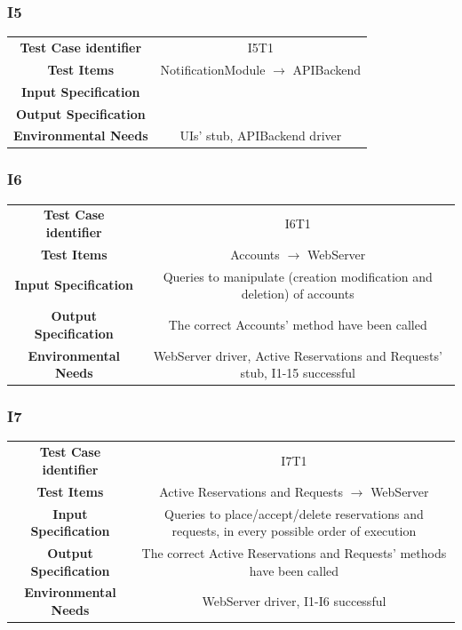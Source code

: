 \documentclass{article}
\begin{document}
\subsubsection{I5}
\begin{adjustbox}{width=1.2\textwidth}	
	\begin{tabular}{*{2}{c}}
		\toprule
		\textbf{Test Case identifier} & I5T1\\
		\textbf{Test Items} & NotificationModule $\rightarrow$ APIBackend\\
		\textbf{Input Specification} & \\ %
		\textbf{Output Specification} & \\%
		\textbf{Environmental Needs} & UIs' stub, APIBackend driver\\
		\bottomrule
	\end{tabular}
\end{adjustbox}
\subsubsection{I6}
\begin{adjustbox}{width=1.2\textwidth}	
	\begin{tabular}{*{2}{c}}
		\toprule
		\textbf{Test Case identifier} & I6T1\\
		\textbf{Test Items} & Accounts $\rightarrow$ WebServer\\
		\textbf{Input Specification} & Queries to manipulate (creation modification and deletion) of accounts\\
		\textbf{Output Specification} & The correct Accounts' method have been called\\
		\textbf{Environmental Needs} & WebServer driver, Active Reservations and Requests' stub, I1-15 successful\\
		\bottomrule
	\end{tabular}
\end{adjustbox}
\subsubsection{I7}
\begin{adjustbox}{width=1.2\textwidth}	
	\begin{tabular}{*{2}{c}}
		\toprule
		\textbf{Test Case identifier} & I7T1\\
		\textbf{Test Items} & Active Reservations and Requests $\rightarrow$ WebServer\\
		\textbf{Input Specification} & Queries to place/accept/delete reservations and requests, in every possible order of execution\\ 
		\textbf{Output Specification} & The correct Active Reservations and Requests' methods have been called\\
		\textbf{Environmental Needs} & WebServer driver, I1-I6 successful\\
		\bottomrule
	\end{tabular}
\end{adjustbox}
\end{document}

